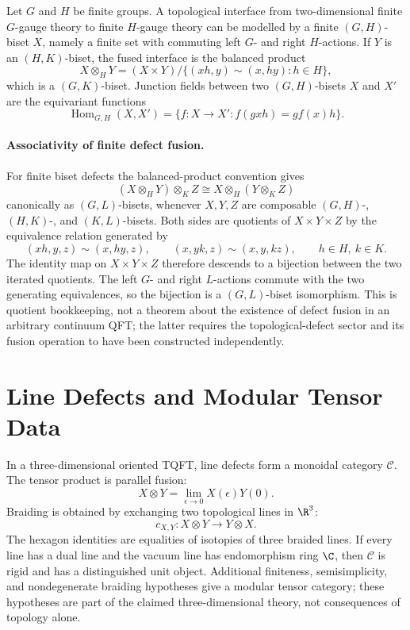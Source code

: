 \begin{example}
\label{ex:finite-gauge-biset-defects}
Let \(G\) and \(H\) be finite groups.  A topological interface from
two-dimensional finite \(G\)-gauge theory to finite \(H\)-gauge theory can be
modelled by a finite \((G,H)\)-biset \(X\), namely a finite set with commuting
left \(G\)- and right \(H\)-actions.  If \(Y\) is an \((H,K)\)-biset, the
fused interface is the balanced product
\[
  X\otimes_H Y
  =
  (X\times Y)/\{(xh,y)\sim(x,hy):h\in H\},
\]
which is a \((G,K)\)-biset.  Junction fields between two \((G,H)\)-bisets
\(X\) and \(X'\) are the equivariant functions
\[
  \operatorname{Hom}_{G,H}(X,X')
  =
  \{f:X\to X': f(gxh)=gf(x)h\}.
\]
\end{example}

\paragraph{Associativity of finite defect fusion.}
For finite biset defects the balanced-product convention gives
\[
  (X\otimes_H Y)\otimes_K Z
  \cong
  X\otimes_H (Y\otimes_K Z)
\]
canonically as \((G,L)\)-bisets, whenever \(X,Y,Z\) are composable
\((G,H)\)-, \((H,K)\)-, and \((K,L)\)-bisets.
Both sides are quotients of \(X\times Y\times Z\) by the equivalence relation
generated by
\[
  (xh,y,z)\sim(x,hy,z),
  \qquad
  (x,yk,z)\sim(x,y,kz),
  \qquad h\in H,\ k\in K .
\]
The identity map on \(X\times Y\times Z\) therefore descends to a bijection
between the two iterated quotients.  The left \(G\)- and right \(L\)-actions
commute with the two generating equivalences, so the bijection is a
\((G,L)\)-biset isomorphism.  This is quotient bookkeeping, not a theorem
about the existence of defect fusion in an arbitrary continuum QFT; the latter
requires the topological-defect sector and its fusion operation to have been
constructed independently.

\section{Line Defects and Modular Tensor Data}

In a three-dimensional oriented TQFT, line defects form a monoidal category
\(\mathcal C\).  The tensor product is parallel fusion:
\[
  X\otimes Y=\lim_{\epsilon\to0}X(\epsilon)Y(0).
\]
Braiding is obtained by exchanging two topological lines in \(\R^3\):
\[
  c_{X,Y}:X\otimes Y\longrightarrow Y\otimes X.
\]
The hexagon identities are equalities of isotopies of three braided lines.
If every line has a dual line and the vacuum line has endomorphism ring
\(\C\), then \(\mathcal C\) is rigid and has a distinguished unit object.
Additional finiteness, semisimplicity, and nondegenerate braiding hypotheses
give a modular tensor category; these hypotheses are part of the claimed
three-dimensional theory, not consequences of topology alone.

